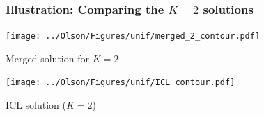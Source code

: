 \documentclass[mathserif,compress]{beamer}
\renewcommand\;{\,}
\begin{document}
\begin{frame}\frametitle{Illustration: Comparing the $K = 2$ solutions}
\begin{center}

\begin{minipage}{0.45\linewidth}
\texttt{[image: ../Olson/Figures/unif/merged\_2\_contour.pdf]}
\begin{center}
Merged solution for $K = 2$
\end{center}
\end{minipage}
\hfill
\begin{minipage}{0.45\linewidth}
\texttt{[image: ../Olson/Figures/unif/ICL\_contour.pdf]}
\begin{center}
ICL solution ($K = 2$)
\end{center}
\end{minipage}
\end{center}
\end{frame}
\end{document}
